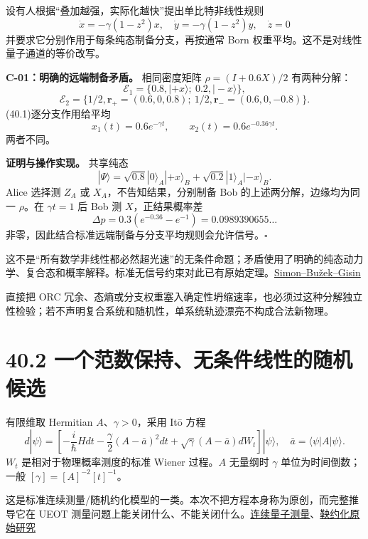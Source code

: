 \documentclass[
  11pt,
  oneside]{book}
\begin{document}
设有人根据``叠加越强，实际化越快''提出单比特非线性规则 \[
\dot x=-\gamma(1-z^2)x,\quad
\dot y=-\gamma(1-z^2)y,\quad \dot z=0
\tag{40.1}
\] 并要求它分别作用于每条纯态制备分支，再按通常 Born
权重平均。这不是对线性量子通道的等价改写。

\protect\hypertarget{c-01}{}{}

\textbf{C-01：明确的远端制备矛盾。} 相同密度矩阵 \(\rho=(I+0.6X)/2\)
有两种分解： \[
\mathcal E_1=\{0.8,|+x\rangle;\ 0.2,|-x\rangle\},
\] \[
\mathcal E_2=\{1/2,\mathbf r_+=(0.6,0,0.8);\
1/2,\mathbf r_-=(0.6,0,-0.8)\}.
\] (40.1)逐分支作用给平均 \[
x_1(t)=0.6e^{-\gamma t},\qquad
x_2(t)=0.6e^{-0.36\gamma t}.
\tag{40.2}
\] 两者不同。

\textbf{证明与操作实现。} 共享纯态 \[
|\Psi\rangle=\sqrt{0.8}|0\rangle_A|+x\rangle_B
+\sqrt{0.2}|1\rangle_A|-x\rangle_B.
\] Alice 选择测 \(Z_A\) 或 \(X_A\)，不告知结果，分别制备 Bob
的上述两分解，边缘均为同一 \(\rho\)。在 \(\gamma t=1\) 后 Bob 测
\(X\)，正结果概率差 \[
\Delta p=0.3(e^{-0.36}-e^{-1})=0.0989390655\ldots
\] 非零，因此结合标准远端制备与分支平均规则会允许信号。\(\square\)

这不是``所有数学非线性都必然超光速''的无条件命题；矛盾使用了明确的纯态动力学、复合态和概率解释。标准无信号约束对此已有原始定理。\href{https://arxiv.org/abs/quant-ph/0102125}{Simon--Bužek--Gisin}

直接把 ORC
冗余、态熵或分支权重塞入确定性坍缩速率，也必须过这种分解独立性检验；若不声明复合系统和随机性，单系统轨迹漂亮不构成合法新物理。

\hypertarget{ux4e00ux4e2aux8303ux6570ux4fddux6301ux65e0ux6761ux4ef6ux7ebfux6027ux7684ux968fux673aux5019ux9009}{%
\section{40.2
一个范数保持、无条件线性的随机候选}\label{ux4e00ux4e2aux8303ux6570ux4fddux6301ux65e0ux6761ux4ef6ux7ebfux6027ux7684ux968fux673aux5019ux9009}}

有限维取 Hermitian \(A\)、\(\gamma>0\)，采用 Itō 方程 \[
d|\psi\rangle=
\left[-\frac{i}{\hbar}Hdt
-\frac{\gamma}{2}(A-\bar a)^2dt
+\sqrt\gamma(A-\bar a)dW_t\right]|\psi\rangle,
\quad \bar a=\langle\psi|A|\psi\rangle.
\tag{40.3}
\] \(W_t\) 是相对于物理概率测度的标准 Wiener 过程。\(A\) 无量纲时
\(\gamma\) 单位为时间倒数；一般 \([\gamma]=[A]^{-2}[t]^{-1}\)。

这是标准连续测量/随机约化模型的一类。本次不把方程本身称为原创，而完整推导它在
UEOT
测量问题上能关闭什么、不能关闭什么。\href{https://arxiv.org/abs/1301.3626}{连续量子测量}、\href{https://arxiv.org/abs/quant-ph/0107153}{鞅约化原始研究}
\end{document}
